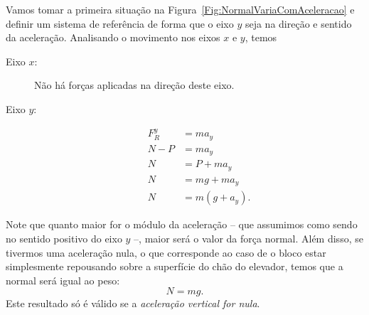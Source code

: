 Vamos tomar a primeira situação na Figura~\ref{Fig:NormalVariaComAceleracao} e definir um sistema de referência de forma que o eixo $y$ seja na direção e sentido da aceleração. Analisando o movimento nos eixos $x$ e $y$, temos
\begin{marginfigure}[5cm]
\centering
{}
\end{marginfigure}

\begin{description}
    \item[Eixo $x$:] Não há forças aplicadas na direção deste eixo.
    \item[Eixo $y$:]
        \begin{align}
            F_R^y &= m a_y \\
            N - P &= m a_y \\
            N &= P + m a_y \\
            N &= mg + m a_y \\
            N &= m(g + a_y). \label{Eq:NormalComAceleracao}
        \end{align}
\end{description}

\noindent{}Note que quanto maior for o módulo da aceleração -- que assumimos como sendo no sentido positivo do eixo $y$ --, maior será o valor da força normal. Além disso, se tivermos uma aceleração nula, o que corresponde ao caso de o bloco estar simplesmente repousando sobre a superfície do chão do elevador, temos que a normal será igual ao peso:
\begin{equation}
    N = mg.
\end{equation}
%
Este resultado só é válido se a \emph{aceleração vertical for nula}.

